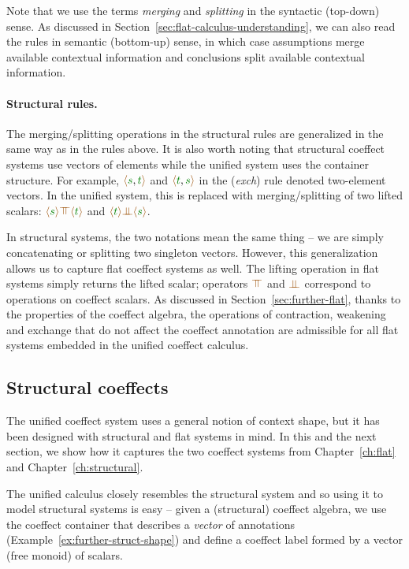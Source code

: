 Note that we use the terms \emph{merging} and \emph{splitting} in the syntactic (top-down) sense. As
discussed in Section~\ref{sec:flat-calculus-understanding}, we can also read
the rules in semantic (bottom-up) sense, in which case assumptions merge available contextual
information and conclusions split available contextual information.

\paragraph{Structural rules.}
The merging/splitting operations in the structural rules are generalized in the same way as in the
rules above. It is also worth noting that structural coeffect systems use vectors of elements while
the unified system uses the container structure.
For example, $\alift{\cclrd{s},\cclrd{t}}$ and $\alift{\cclrd{t},\cclrd{s}}$ in the (\emph{exch})
rule denoted two-element vectors. In the unified system, this is replaced with merging/splitting
of two lifted scalars: $\alift{\cclrd{s}} \azip \alift{\cclrd{t}}$ and $\alift{\cclrd{t}} \apar \alift{\cclrd{s}}$.

In structural systems, the two notations mean the same thing -- we are simply concatenating or splitting two
singleton vectors. However, this generalization allows us to capture flat coeffect systems as well.
The lifting operation in flat systems simply returns the lifted scalar; operators $\azip$ and
$\apar$ correspond to operations on coeffect scalars. As discussed in Section~\ref{sec:further-flat},
thanks to the properties of the coeffect algebra, the operations of contraction, weakening and exchange
that do not affect the coeffect annotation are admissible for all flat systems embedded in the
unified coeffect calculus.


\subsection{Structural coeffects}
\label{sec:further-structural}

The unified coeffect system uses a general notion of context shape, but it has been designed with
structural and flat systems in mind. In this and the next section, we show how it captures
the two coeffect systems from Chapter~\ref{ch:flat} and Chapter~\ref{ch:structural}.

The unified calculus closely resembles the structural system and so using it to model structural
systems is easy -- given a (structural) coeffect algebra, we use the coeffect container that describes
a \emph{vector} of annotations (Example~\ref{ex:further-struct-shape}) and define a coeffect
label formed by a vector (free monoid) of scalars.

